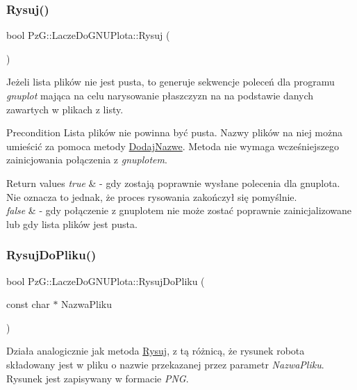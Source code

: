 \subsubsection{\texorpdfstring{Rysuj()}{Rysuj()}}
{\footnotesize\ttfamily bool Pz\+G\+::\+Lacze\+Do\+G\+N\+U\+Plota\+::\+Rysuj (\begin{DoxyParamCaption}{ }\end{DoxyParamCaption})}

Jeżeli lista plików nie jest pusta, to generuje sekwencje poleceń dla programu {\itshape gnuplot} mająca na celu narysowanie płaszczyzn na na podstawie danych zawartych w plikach z listy.

\begin{DoxyPrecond}{Precondition}
Lista plików nie powinna być pusta. Nazwy plików na niej można umieścić za pomoca metody \hyperlink{}{Dodaj\+Nazwe}. Metoda nie wymaga wcześniejszego zainicjowania połączenia z {\itshape gnuplotem}. 
\end{DoxyPrecond}

\begin{DoxyRetVals}{Return values}
{\em true} & -\/ gdy zostają poprawnie wysłane polecenia dla gnuplota. Nie oznacza to jednak, że proces rysowania zakończył się pomyślnie. \\
\hline
{\em false} & -\/ gdy połączenie z gnuplotem nie może zostać poprawnie zainicjalizowane lub gdy lista plików jest pusta. \\
\hline
\end{DoxyRetVals}
\mbox{\label{classPzG_1_1LaczeDoGNUPlota_addae9ac156ae2fb227f792faff3aa148}} 
\subsubsection{\texorpdfstring{Rysuj\+Do\+Pliku()}{RysujDoPliku()}}
{\footnotesize\ttfamily bool Pz\+G\+::\+Lacze\+Do\+G\+N\+U\+Plota\+::\+Rysuj\+Do\+Pliku (\begin{DoxyParamCaption}\item[{const char $\ast$}]{Nazwa\+Pliku }\end{DoxyParamCaption})}

Działa analogicznie jak metoda \hyperlink{classPzG_1_1LaczeDoGNUPlota_a065f5b8402737cc62b0ad4f66d028335}{Rysuj}, z tą różnicą, że rysunek robota składowany jest w pliku o nazwie przekazanej przez parametr {\itshape Nazwa\+Pliku}. Rysunek jest zapisywany w formacie {\itshape P\+NG}.

